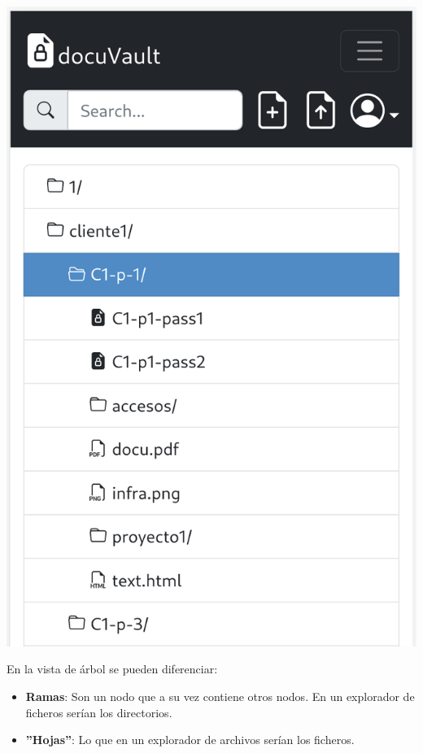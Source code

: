 \documentclass{\ClassPath/viu-tfm-template}
\begin{document}
{\begin{minipage}{0.3\linewidth}
\end{minipage}
\hfill
\begin{minipage}{0.3\linewidth}
    \includegraphics[width=\linewidth]{img/tree3.png}
\end{minipage}
}

En la vista de árbol se pueden diferenciar:

\begin{itemize}
    \item \textbf{Ramas}: Son un nodo que a su vez contiene otros nodos. En un explorador de ficheros serían los directorios.
    \item \textbf{”Hojas”}: Lo que en un explorador de archivos serían los ficheros.
\end{itemize}
\end{document}
